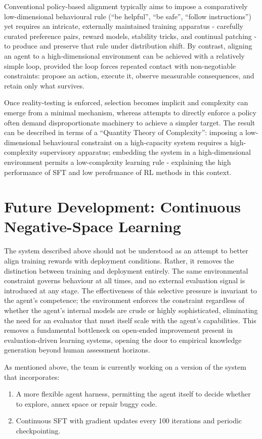 \documentclass{article}
\begin{document}
Conventional policy-based alignment typically aims to impose a comparatively low-dimensional behavioural rule (“be helpful”, “be safe”, “follow instructions”) yet requires an intricate, externally maintained training apparatus - carefully curated preference pairs, reward models, stability tricks, and continual patching - to produce and preserve that rule under distribution shift. By contrast, aligning an agent to a high-dimensional environment can be achieved with a relatively simple loop, provided the loop forces repeated contact with non-negotiable constraints: propose an action, execute it, observe measurable consequences, and retain only what survives. 

Once reality-testing is enforced, selection becomes implicit and complexity can emerge from a minimal mechanism, whereas attempts to directly enforce a policy often demand disproportionate machinery to achieve a simpler target. The result can be described in terms of a “Quantity Theory of Complexity”: imposing a low-dimensional behavioural constraint on a high-capacity system requires a high-complexity supervisory apparatus; embedding the system in a high-dimensional environment permits a low-complexity learning rule - explaining the high performance of SFT and low perofrmance of RL methods in this context.

\section{Future Development: Continuous Negative-Space Learning}
The system described above should not be understood as an attempt to better align training rewards with deployment conditions. Rather, it removes the distinction between training and deployment entirely. The same environmental constraint governs behaviour at all times, and no external evaluation signal is introduced at any stage. The effectiveness of this selective pressure is invariant to the agent’s competence; the environment enforces the constraint regardless of whether the agent’s internal models are crude or highly sophisticated, eliminating the need for an evaluator that must itself scale with the agent’s capabilities. This removes a fundamental bottleneck on open-ended improvement present in evaluation-driven learning systems, opening the door to empirical knowledge generation beyond human assessment horizons.

As mentioned above, the team is currently working on a version of the system that incorporates:
\begin{enumerate}
    \item A more flexible agent harness, permitting the agent itself to decide whether to explore, annex space or repair buggy code.
    \item Continuous SFT with gradient updates every 100 iterations and periodic checkpointing.
\end{enumerate}
\end{document}
